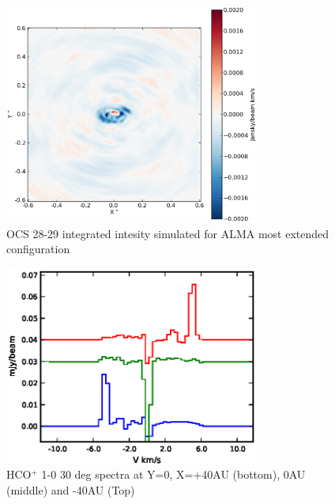 \documentclass[useAMS,usenatbib]{mn2e}
\begin{document}
\begin{figure}
 \includegraphics[width=84mm]{Figures/sim/casa_imageOCS_28-27_30deg_composite_ALMAwidth_big_dirty_contSub.eps}

 \caption{OCS 28-29 integrated intesity simulated for ALMA most extended configuration}
\end{figure}

\begin{figure}
 \includegraphics[width=84mm]{Figures/sim/casa_HCOp_spectra_40_AUsplit.eps}

 \caption{HCO$^+$ 1-0 30 deg spectra at Y=0, X=+40AU (bottom), 0AU (middle) and -40AU (Top)}
\end{figure}
\end{document}
